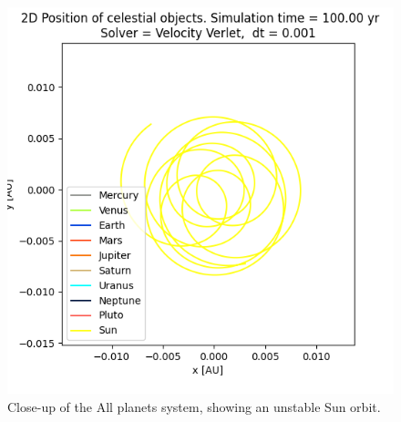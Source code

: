 \documentclass[american,a4paper,12pt]{article}
\begin{document}
\begin{figure}[H]
\begin{minipage}[b]{0.49\textwidth}
    \includegraphics[width=\textwidth]{figures/All_planets_Sun_drift.png}
    \caption{Close-up of the All planets system, showing an unstable Sun orbit.}
    \label{fig:All_planets_Sun}
  \end{minipage}
\end{figure}
\end{document}
